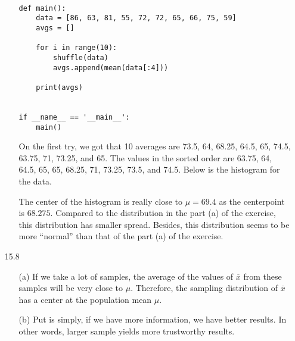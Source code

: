 \documentclass[11pt, a4paper]{article}
\begin{document}
\begin{itemize}
\begin{itemize}
\begin{verbatim}
    
def main():
    data = [86, 63, 81, 55, 72, 72, 65, 66, 75, 59]
    avgs = []

    for i in range(10):
        shuffle(data)
        avgs.append(mean(data[:4]))

    print(avgs)


if __name__ == '__main__':
    main()
\end{verbatim}
\item[]
\item[]

On the first try, we got that 10 averages
are 73.5, 64, 68.25, 64.5, 65, 74.5, 63.75, 71, 73.25, and 65.
The values in the sorted order are 63.75, 64, 64.5, 65, 65, 68.25, 71, 73.25, 73.5, and 74.5.
Below is the histogram for the data.
\begin{center}
\end{center}

\item[]

The center of the histogram is really close to $\mu = 69.4$ as the centerpoint is $68.275$.
Compared to the distribution in the part (a) of the exercise, this distribution has smaller
spread. Besides, this distribution seems to be more ``normal'' than that of the part (a) of the
exercise.
\end{itemize}

\item[]
\item[]

\item[15.8]
\begin{itemize}
\item[(a)]
If we take a lot of samples, the average of the values of $\overline{x}$
from these samples will be very close to $\mu$. Therefore, the sampling
distribution of $\overline{x}$ has a center at the population mean $\mu$.

\item[]

\item[(b)]
Put is simply, if we have more information, we have better results.
In other words, larger sample yields more trustworthy results.
\end{itemize}


\end{itemize}
\end{document}

